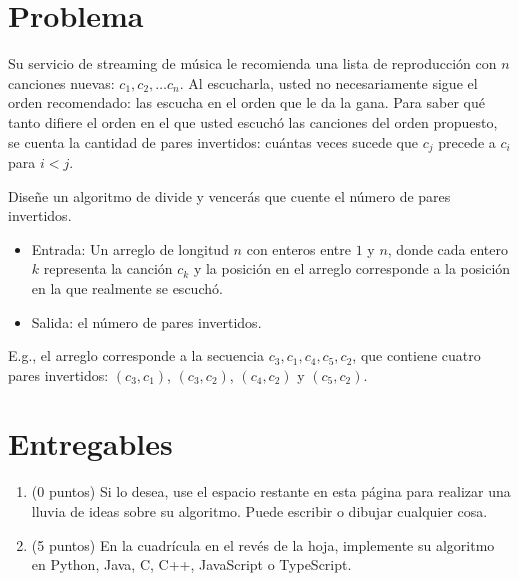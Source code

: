 \section{Problema}
Su servicio de streaming de música le recomienda una lista de reproducción con $n$ canciones nuevas: $c_1, c_2, \ldots c_n$. Al escucharla, usted no necesariamente sigue el orden recomendado: las escucha en el orden que le da la gana. Para saber qué tanto difiere el orden en el que usted escuchó las canciones del orden propuesto, se cuenta la cantidad de pares invertidos: cuántas veces sucede que $c_j$ precede a $c_i$ para $i < j$.

Diseñe un algoritmo de divide y vencerás que cuente el número de pares invertidos.
\begin{itemize}
  \item Entrada: Un arreglo  de longitud \(n\) con enteros entre $1$ y $n$, donde cada entero $k$ representa la canción $c_k$ y la posición en el arreglo corresponde a la posición en la que realmente se escuchó.
  \item Salida: el número de pares invertidos.
\end{itemize}

E.g., el arreglo \inline{[3, 1, 4, 5, 2]} corresponde a la secuencia \(c_3, c_1, c_4, c_5, c_2\), que contiene cuatro pares invertidos: \((c_3, c_1)\), \((c_3, c_2)\), \((c_4, c_2)\) y \((c_5, c_2)\).

\section{Entregables}

\begin{enumerate}
  \item (0 puntos) Si lo desea, use el espacio restante en esta página para realizar una lluvia de ideas sobre su algoritmo. Puede escribir o dibujar cualquier cosa.
  \item (5 puntos) En la cuadrícula en el revés de la hoja, implemente su algoritmo en Python, Java, C, C++, JavaScript o TypeScript.
\end{enumerate}
